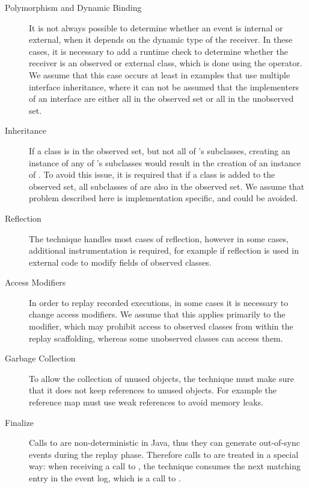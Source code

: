 \begin{description}
 \item [Polymorphism and Dynamic Binding] It is not always possible to determine whether an event is internal or external, when it depends on the dynamic type of the receiver. In these cases, it is necessary to add a runtime check to determine whether the receiver is an observed or external class, which is done using the  operator. We assume that this case occurs at least in examples that use multiple interface inheritance, where it can not be assumed that the implementers of an interface are either all in the observed set or all in the unobserved set.
 \item [Inheritance] If a class  is in the observed set, but not all of 's subclasses, creating an instance of any of 's subclasses would result in the creation of an instance of . To avoid this issue, it is required that if a class  is added to the observed set, all subclasses of  are also in the observed set. We assume that problem described here is implementation specific, and could be avoided.
 \item [Reflection] The technique handles most cases of reflection, however in some cases, additional instrumentation is required, for example if reflection is used in external code to modify fields of observed classes. 
 \item [Access Modifiers] In order to replay recorded executions, in some cases it is necessary to change access modifiers. We assume that this applies primarily to the  modifier, which may prohibit access to observed classes from within the replay scaffolding, whereas some unobserved classes can access them.
 \item [Garbage Collection] To allow the collection of unused objects, the technique must make sure that it does not keep references to unused objects. For example the reference map must use weak references to avoid memory leaks.
 \item [Finalize] Calls to  are non-deterministic in Java, thus they can generate out-of-sync events during the replay phase. Therefore calls to  are treated in a special way: when receiving a call to , the technique consumes the next matching entry in the event log, which is a call to .
\end{description}
